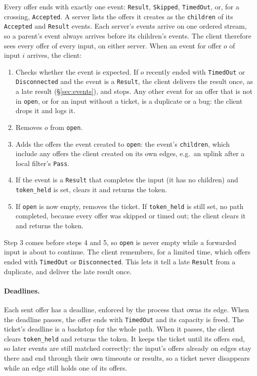 \documentclass[11pt]{article}
\newcommand{\code}[1]{\texttt{#1}}
\begin{document}
Every offer ends with exactly one event: \code{Result}, \code{Skipped},
\code{TimedOut}, or, for a crossing, \code{Accepted}. A server lists the
offers it creates as the \code{children} of its \code{Accepted} and
\code{Result} events. Each server's events arrive on one ordered stream, so a
parent's event always arrives before its children's events. The client
therefore sees every offer of every input, on either server. When an event for
offer $o$ of input $i$ arrives, the client:
\begin{enumerate}[nosep]
  \item Checks whether the event is expected. If $o$ recently ended with
        \code{TimedOut} or \code{Disconnected} and the event is a
        \code{Result}, the client delivers the result once, as a late result
        (\S\ref{sec:events}), and stops.
        Any other event for an offer that is not in \code{open}, or for an
        input without a ticket, is a duplicate or a bug: the client drops it
        and logs it.
  \item Removes $o$ from \code{open}.
  \item Adds the offers the event created to \code{open}: the event's
        \code{children}, which include any offers the client created on its
        own edges, e.g.\ an uplink after a local filter's \code{Pass}.
  \item If the event is a \code{Result} that completes the input (it has no
        children) and \code{token\_held} is set, clears it and returns the
        token.
  \item If \code{open} is now empty, removes the ticket. If
        \code{token\_held} is still set, no path completed, because every
        offer was skipped or timed out; the client clears it and returns the
        token.
\end{enumerate}
Step 3 comes before steps 4 and 5, so \code{open} is never empty while a
forwarded input is about to continue. The client remembers, for a limited
time, which offers ended with \code{TimedOut} or \code{Disconnected}. This
lets it tell a late \code{Result} from a duplicate, and deliver the late
result once.

\paragraph{Deadlines.} Each sent offer has a deadline, enforced by the process
that owns its edge. When the deadline passes, the offer ends with
\code{TimedOut} and its capacity is freed. The ticket's deadline is a backstop
for the whole path. When it passes, the client clears \code{token\_held} and
returns the token. It keeps the ticket until its offers end, so later events
are still matched correctly: the input's offers already on edges stay there
and end through their own timeouts or results, so a ticket never disappears
while an edge still holds one of its offers.
\end{document}
